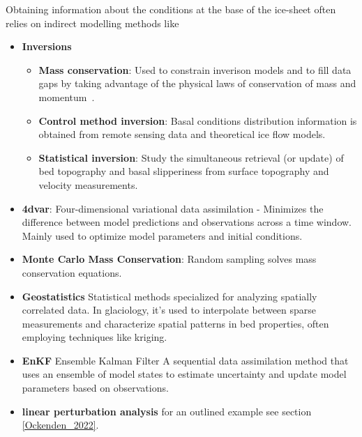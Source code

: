 Obtaining information about the conditions at the base of the ice-sheet often relies on indirect modelling methods like
\begin{itemize}

    \item\textbf{Inversions}
        \begin{itemize}
            \item\textbf{Mass conservation}: Used to constrain inverison models and to fill data gaps by taking advantage of the physical laws of conservation of mass and momentum~\cite{Morlighem_2017, Morlighem_2020}. 
            \item\textbf{Control method inversion}: Basal conditions distribution information is obtained from remote sensing data and theoretical ice flow models\cite{deRydt_2013}.
            \item\textbf{Statistical inversion}: Study the simultaneous retrieval (or update) of bed topography and basal slipperiness from surface topography and velocity measurements\cite{deRydt_2013}.
        \end{itemize}

    \item\textbf{4dvar}: Four-dimensional variational data assimilation - Minimizes the difference between model predictions and observations across a time window. Mainly used to optimize model parameters and initial conditions\cite{Morlighem_Goldberg_2024}.

    \item\textbf{Monte Carlo Mass Conservation}: Random sampling solves mass conservation equations\cite{Brinkerhoff_2016}. 

    \item\textbf{Geostatistics} Statistical methods specialized for analyzing spatially correlated data. In glaciology, it's used to interpolate between sparse measurements and characterize spatial patterns in bed properties, often employing techniques like kriging\cite{Mackie_2020}.

    \item\textbf{EnKF} Ensemble Kalman Filter A sequential data assimilation method that uses an ensemble of model states to estimate uncertainty and update model parameters based on observations\cite{Morlighem_Goldberg_2024}.

    \item\textbf{linear perturbation analysis} for an outlined example see section \ref{Ockenden_2022}.
\end{itemize} 

